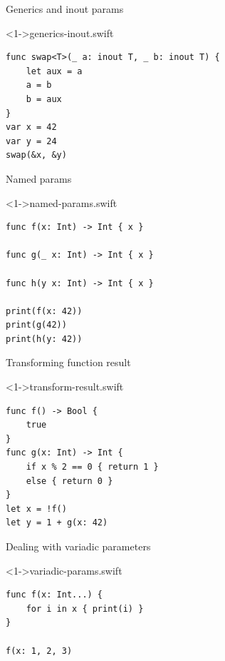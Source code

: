 \documentclass[hyperref={pdfpagelabels=false},xcolor={dvipsnames},compress,table,usenames,dvipsnames]{beamer}
\begin{document}
    \begin{frame}[fragile]{Generics and inout params}
        \begin{exampleblock}
            <1->{generics-inout.swift}
            \begin{lstlisting}
func swap<T>(_ a: inout T, _ b: inout T) {
    let aux = a
    a = b
    b = aux
}
var x = 42
var y = 24
swap(&x, &y)
            \end{lstlisting}
        \end{exampleblock}
    \end{frame}

    \begin{frame}[fragile]{Named params}
        \begin{exampleblock}
            <1->{named-params.swift}
            \begin{lstlisting}
func f(x: Int) -> Int { x }

func g(_ x: Int) -> Int { x }

func h(y x: Int) -> Int { x }

print(f(x: 42))
print(g(42))
print(h(y: 42))
            \end{lstlisting}
        \end{exampleblock}
    \end{frame}

    \begin{frame}[fragile]{Transforming function result}
        \begin{exampleblock}
            <1->{transform-result.swift}
            \begin{lstlisting}
func f() -> Bool {
    true
}
func g(x: Int) -> Int {
    if x % 2 == 0 { return 1 }
    else { return 0 }
}
let x = !f()
let y = 1 + g(x: 42)
            \end{lstlisting}
        \end{exampleblock}
    \end{frame}

    \begin{frame}[fragile]{Dealing with variadic parameters}
        \begin{exampleblock}
            <1->{variadic-params.swift}
            \begin{lstlisting}
func f(x: Int...) {
    for i in x { print(i) }
}

f(x: 1, 2, 3)
            \end{lstlisting}
        \end{exampleblock}
    \end{frame}
\end{document}

